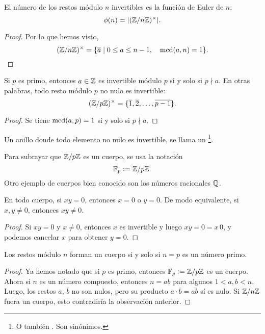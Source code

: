 \documentclass{article}
\theoremstyle{plain}
\begin{document}
\begin{corolario}
  El número de los restos módulo $n$ invertibles es la función de Euler de $n$:
  $$\phi (n) = |(\mathbb{Z}/n\mathbb{Z})^\times|.$$

  \begin{proof}
    Por lo que hemos visto,
    \[ (\mathbb{Z}/n\mathbb{Z})^\times = \{ \overline{a} \mid
      0 \le a \le n-1, \quad \operatorname{mcd} (a,n) = 1 \}. \qedhere \]
\end{proof}
\end{corolario}

\begin{corolario}
  Si $p$ es primo, entonces $a\in \mathbb{Z}$ es invertible módulo $p$ si y solo si
  $p \nmid a$. En otras palabras, todo resto módulo $p$ no nulo es invertible:
  $$(\mathbb{Z}/p\mathbb{Z})^\times = \{ \overline{1}, \overline{2}, \ldots, \overline{p-1} \}.$$

  \begin{proof}
    Se tiene $\operatorname{mcd} (a,p) = 1$ si y solo si $p\nmid a$.
  \end{proof}
\end{corolario}

\begin{definicion}
  Un anillo donde todo elemento no nulo es invertible, se llama un
  \footnote{O también . Son sinónimos.}.
\end{definicion}

Para subrayar que $\mathbb{Z}/p\mathbb{Z}$ es un cuerpo, se usa la notación
$$\mathbb{F}_p \mathrel{\mathop:}= \mathbb{Z}/p\mathbb{Z}.$$
Otro ejemplo de cuerpos bien conocido son los números racionales $\mathbb{Q}$.

\begin{observacion}
  \label{obs:en-cuerpo-no-hay-div-de-cero}
  En todo cuerpo, si $xy = 0$, entonces $x = 0$ o $y = 0$. De modo equivalente,
  si $x,y \ne 0$, entonces $xy \ne 0$.

  \begin{proof}
    Si $xy = 0$ y $x \ne 0$, entonces $x$ es invertible y luego $xy = 0 = x\,0$,
    y podemos cancelar $x$ para obtener $y = 0$.
  \end{proof}
\end{observacion}

\begin{corolario}
  Los restos módulo $n$ forman un cuerpo si y solo si $n = p$ es un número
  primo.

\begin{proof}
  Ya hemos notado que si $p$ es primo, entonces $\mathbb{F}_p \mathrel{\mathop:}= \mathbb{Z}/p\mathbb{Z}$ es un
  cuerpo. Ahora si $n$ es un número compuesto, entonces $n = ab$ para algunos
  $1 < a,b < n$. Luego, los restos $\overline{a}$, $\overline{b}$ no son nulos,
  pero su producto $\overline{a}\cdot\overline{b} = \overline{ab}$ sí es
  nulo. Si $\mathbb{Z}/n\mathbb{Z}$ fuera un cuerpo, esto contradiría la observación anterior.
\end{proof}
\end{corolario}
\end{document}
